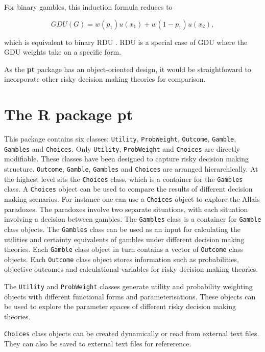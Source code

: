\documentclass{article}\usepackage[]{graphicx}\usepackage[]{color}
\begin{document}
For binary gambles, this induction formula reduces to 

\begin{equation}
GDU(G) = w(p_1) u(x_1) + w(1-p_1) u(x_2),
\label{gdu_binary_equation}
\end{equation}

which is equivalent to binary RDU \cite[p. 143]{Marley_Luce_2001}.
RDU is a special case of GDU where the GDU weights take on a specific form.

As the {\bf pt} package has an object-oriented design, it would be straightfoward to incorporate other risky decision making theories for comparison.

\section{The R package pt}

This package contains six classes: {\tt Utility}, {\tt ProbWeight}, {\tt Outcome}, {\tt Gamble}, {\tt Gambles} and {\tt Choices}. Only {\tt Utility}, {\tt ProbWeight} and {\tt Choices} are directly modifiable.
These classes have been designed to capture risky decision making structure. {\tt Outcome}, {\tt Gamble}, {\tt Gambles} and {\tt Choices} are arranged hierarchically. At the highest level sits the {\tt Choices} class, which is a container for the {\tt Gambles} class. A {\tt Choices} object can
be used to compare the results of different decision making scenarios. For instance one can use a {\tt Choices} object to explore the Allais paradoxes. The paradoxes involve two separate situations, with each situation involving a decision between gambles. The {\tt Gambles} class is a container for {\tt Gamble} class objects. The {\tt Gambles} class can be used as an input for calculating the utilities and certainty equivalents of gambles under different decision making theories. Each {\tt Gamble} class object in turn contains a vector of {\tt Outcome} class objects. Each {\tt Outcome} class object stores information such as probabilities, objective outcomes and calculational variables for risky decision making theories.

The {\tt Utility} and {\tt ProbWeight} classes generate utility and probability weighting objects with different functional forms and parameterisations. These objects can be used to explore the parameter spaces of different risky decision making theories.

{\tt Choices} class objects can be created dynamically or read from external text files. They can also be saved to external
text files for refererence.
\end{document}
